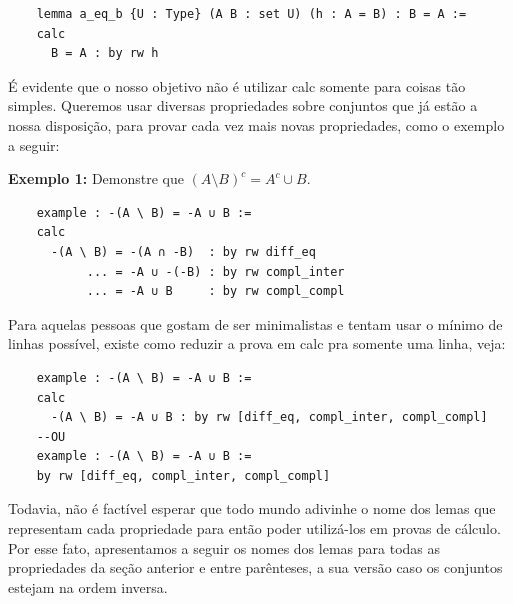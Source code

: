   \begin{lstlisting}
    lemma a_eq_b {U : Type} (A B : set U) (h : A = B) : B = A :=
    calc
      B = A : by rw h \end{lstlisting}

  É evidente que o nosso objetivo não é utilizar {\selectfont calc} somente para coisas tão simples. Queremos usar diversas propriedades sobre conjuntos que já estão a nossa disposição, para provar cada vez mais novas propriedades, como o exemplo a seguir:

  \textbf{Exemplo 1:} Demonstre que $(A \setminus B)^c = A^c \cup B$.
  \begin{lstlisting}
    example : -(A \ B) = -A ∪ B :=
    calc
      -(A \ B) = -(A ∩ -B)  : by rw diff_eq
           ... = -A ∪ -(-B) : by rw compl_inter
           ... = -A ∪ B     : by rw compl_compl \end{lstlisting}

  Para aquelas pessoas que gostam de ser minimalistas e tentam usar o mínimo de linhas possível, existe como reduzir a prova em {\selectfont calc} pra somente uma linha, veja:

  \begin{lstlisting}
    example : -(A \ B) = -A ∪ B :=
    calc
      -(A \ B) = -A ∪ B : by rw [diff_eq, compl_inter, compl_compl]
    --OU
    example : -(A \ B) = -A ∪ B :=
    by rw [diff_eq, compl_inter, compl_compl] \end{lstlisting}

  Todavia, não é factível esperar que todo mundo adivinhe o nome dos lemas que representam cada propriedade para então poder utilizá-los em provas de cálculo. Por esse fato, apresentamos a seguir os nomes dos lemas para todas as propriedades da seção anterior e entre parênteses, a sua versão caso os conjuntos estejam na ordem inversa.

